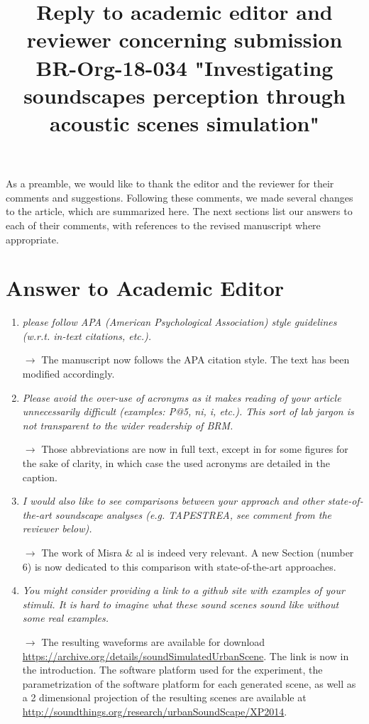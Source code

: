 \documentclass[10pt]{article}
\title{Reply to academic editor and reviewer concerning submission BR-Org-18-034 "Investigating soundscapes perception through acoustic scenes simulation"}
\begin{document}
\maketitle

As a preamble, we would like to thank the editor and the reviewer for their comments and suggestions. Following these comments, we made several changes to the article, which are summarized here. The next sections list our answers to each of their comments, with references to the revised manuscript where appropriate.

\section{Answer to Academic Editor}

\begin{enumerate}

\item \emph{please follow APA (American Psychological Association) style guidelines (w.r.t. in-text citations, etc.).}

$\rightarrow$ The manuscript now follows the APA citation style. The text has been modified accordingly.

\item \emph{ Please avoid the over-use of acronyms as it makes reading of your article unnecessarily difficult (examples: P@5, ni, i, etc.). This sort of lab jargon is not transparent to the wider readership of BRM. }

$\rightarrow$ Those abbreviations are now in full text, except in for some figures for the sake of clarity, in which case the used acronyms are detailed in the caption.

\item \emph{I would also like to see comparisons between your approach and other state-of-the-art soundscape analyses (e.g. TAPESTREA, see comment from the reviewer below).}

$\rightarrow$ The work of Misra \& al is indeed very relevant. A new Section (number 6) is now dedicated to this comparison with state-of-the-art approaches.

\item \emph{You might consider providing a link to a github site with examples of your stimuli. It is hard to imagine what these sound scenes sound like without some real examples.}

$\rightarrow$ The resulting waveforms are available for download \url{https://archive.org/details/soundSimulatedUrbanScene}. The link is now in the introduction. The software platform used for the experiment, the parametrization of the software platform for each generated scene, as well as a 2 dimensional projection of the resulting scenes are available at \url{http://soundthings.org/research/urbanSoundScape/XP2014}.



\end{enumerate}
\end{document}
